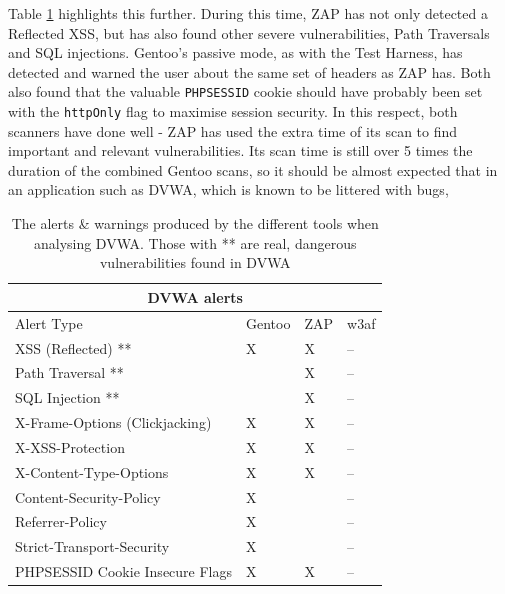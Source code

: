 Table \ref{table:dvwa_alerts} highlights this further. During this time, ZAP has not only detected a Reflected XSS, but has also found other severe vulnerabilities, Path Traversals and SQL injections. Gentoo's passive mode, as with the Test Harness, has detected and warned the user about the same set of headers as ZAP has. Both also found that the valuable \texttt{PHPSESSID} cookie should have probably been set with the \texttt{httpOnly} flag to maximise session security. In this respect, both scanners have done well - ZAP has used the extra time of its scan to find important and relevant vulnerabilities. Its scan time is still over 5 times the duration of the combined Gentoo scans, so it should be almost expected that in an application such as DVWA, which is known to be littered with bugs, 



\begin{table}[h]
	
	{
		
		\captionsetup{justification=centering}
		
		\caption{The alerts \& warnings produced by the different tools when analysing DVWA. Those with ** are real, dangerous vulnerabilities found in DVWA}
		\label{table:dvwa_alerts}
		\begin{tabular}{ |p{7cm}|>{\centering\arraybackslash}m{2cm} |>{\centering\arraybackslash}m{2cm} |>{\centering\arraybackslash}m{2cm}| }
			\hline
			\multicolumn{4}{|c|}{\textbf{DVWA alerts}} \\ [0.5ex]
			\hline \hline 
			Alert Type & Gentoo & ZAP & w3af \\
			\hline
			XSS (Reflected) ** & X & X & --\\
			Path Traversal ** &  & X & --\\
			SQL Injection **& & X & --\\
			X-Frame-Options (Clickjacking) & X & X & -- \\
			X-XSS-Protection & X & X & --\\
			X-Content-Type-Options& X & X &-- \\
			Content-Security-Policy & X & &-- \\
			Referrer-Policy & X & & --\\
			Strict-Transport-Security & X  & & --\\
			PHPSESSID Cookie Insecure Flags & X & X & -- \\
			\hline
		\end{tabular}
	} \\
\end{table}



